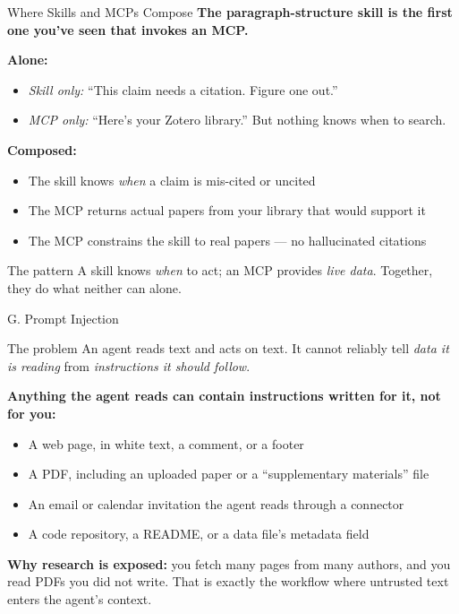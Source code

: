 \documentclass[aspectratio=169, 11pt]{beamer}
\begin{document}
\begin{frame}{Where Skills and MCPs Compose}
  \textbf{The paragraph-structure skill is the first one you've seen that invokes an MCP.}

  \vspace{0.5em}
  \textbf{Alone:}
  \begin{itemize}
    \item \emph{Skill only:} ``This claim needs a citation. Figure one out.''
    \item \emph{MCP only:} ``Here's your Zotero library.'' But nothing knows when to search.
  \end{itemize}

  \vspace{0.5em}
  \textbf{Composed:}
  \begin{itemize}
    \item The skill knows \emph{when} a claim is mis-cited or uncited
    \item The MCP returns actual papers from your library that would support it
    \item The MCP constrains the skill to real papers --- no hallucinated citations
  \end{itemize}

  \vspace{0.4em}
  \begin{alertblock}{The pattern}
    A skill knows \emph{when} to act; an MCP provides \emph{live data}. Together, they do what neither can alone.
  \end{alertblock}
  \vfill
  \hyperlink{backmatter}{}
\end{frame}



\begin{frame}[label=pinj]{G. Prompt Injection}
  \begin{alertblock}{The problem}
    An agent reads text and acts on text. It cannot reliably tell \emph{data it is reading} from \emph{instructions it should follow}.
  \end{alertblock}

  \vspace{0.6em}
  \textbf{Anything the agent reads can contain instructions written for it, not for you:}
  \begin{itemize}
    \item A web page, in white text, a comment, or a footer
    \item A PDF, including an uploaded paper or a ``supplementary materials'' file
    \item An email or calendar invitation the agent reads through a connector
    \item A code repository, a README, or a data file's metadata field
  \end{itemize}

  \vspace{0.6em}
  \textbf{Why research is exposed:} you fetch many pages from many authors, and you read PDFs you did not write. That is exactly the workflow where untrusted text enters the agent's context.
\end{frame}
\end{document}
